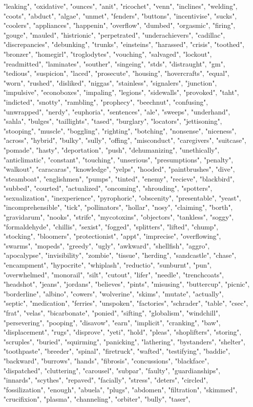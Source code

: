 "leaking", "oxidative", "ounces", "anit", "ricochet", "venn", "inclines", "welding", "coots", "abduct", "algae", "unmet", "fenders", "buttons", "incentivise", "sucks", "coolers", "appliances", "happenin", "overflow", "dumbed", "orgasmic", "firing", "gouge", "mauled", "histrionic", "perpetrated", "underachievers", "cadillac", "discrepancies", "debunking", "trunks", "einsteins", "harassed", "crisis", "toothed", "bronzer", "homegirl", "troglodytes", "vouching", "salvaged", "lockout", "readmitted", "laminates", "souther", "singeing", "stds", "distraught", "gm", "tedious", "suspicion", "laced", "prosecute", "housing", "hovercrafts", "equal", "worn", "rushed", "disliked", "niggas", "stainless", "signalers", "junction", "impulsive", "econoboxes", "impaling", "legions", "sidewalls", "provoked", "taht", "indicted", "snotty", "rambling", "prophecy", "beechnut", "confusing", "unwrapped", "nerdy", "euphoria", "sentences", "ale", "sweeps", "underhand", "sahla", "bulges", "taillights", "tased", "burglary", "locators", "jettisoning", "stooping", "muscle", "boggling", "righting", "botching", "nonsense", "niceness", "across", "hybrid", "bulky", "sully", "offing", "misconduct", "caregivers", "suitcase", "pomade", "hasty", "deportation", "push", "dehumanizing", "unethically", "anticlimatic", "constant", "touching", "unserious", "presumptions", "penalty", "walkout", "caracaras", "knowledge", "yelps", "hooded", "paintbrushes", "dive", "steamboat", "englishmen", "pumps", "tinted", "enemy", "recieve", "blackbird", "subbed", "courted", "actualized", "oncoming", "shrouding", "spotters", "sexualization", "inexperience", "pyrophoric", "obscenity", "presentable", "yeast", "incomprehensible", "tick", "pollinators", "hollar", "nosy", "claiming", "borth", "gravidarum", "nooks", "strife", "mycotoxins", "objectors", "tankless", "soggy", "formaldehyde", "chillis", "sexist", "fogged", "splitters", "lifted", "chump", "stocking", "bloomers", "protectionist", "appt", "imprecise", "overflowing", "swarms", "mopeds", "greedy", "ugly", "awkward", "shellfish", "aggro", "apocalypse", "invisibility", "zombie", "tissue", "herding", "sandcastle", "chase", "encampment", "hypocrite", "whiplash", "reductio", "sunburnt", "pun", "overwhelmed", "monorail", "silt", "cutout", "lifer", "needle", "trenchcoats", "headshot", "jeans", "jordans", "believes", "pints", "misusing", "buttercup", "picnic", "borderline", "albino", "cowers", "wolverine", "skims", "mutate", "actually", "septic", "medication", "ferries", "unspoken", "factories", "schrader", "table", "csec", "frat", "velas", "bicarbonate", "ponied", "sifting", "globalism", "windchill", "persevering", "pooping", "disavow", "earn", "implicit", "cranking", "baw", "displacement", "rugs", "disprove", "yeti", "hold", "pleas", "shoplifters", "storing", "scruples", "buried", "squirming", "panicking", "lathering", "bystanders", "shelter", "toothpaste", "breeder", "spinal", "firetruck", "wafted", "testifying", "baddie", "backward", "burrows", "hands", "fibrosis", "concussions", "blackface", "dispatched", "cluttering", "carousel", "subpar", "faulty", "guardianships", "innards", "scythes", "repaved", "facially", "stress", "deters", "circled", "fossilization", "enough", "abuela", "plugs", "abdomen", "filtration", "skimmed", "crucifixion", "plasma", "channeling", "orbiter", "bully", "taser", 
